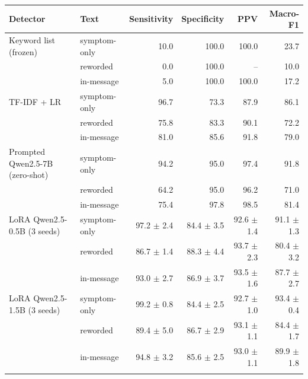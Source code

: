 \begin{tabular}{llrrrr}\toprule
Detector & Text & Sensitivity & Specificity & PPV & Macro-F1 \\ \midrule
Keyword list (frozen) & symptom-only & 10.0 & 100.0 & 100.0 & 23.7 \\
 & reworded & 0.0 & 100.0 & -- & 10.0 \\
 & in-message & 5.0 & 100.0 & 100.0 & 17.2 \\
\addlinespace
TF-IDF + LR & symptom-only & 96.7 & 73.3 & 87.9 & 86.1 \\
 & reworded & 75.8 & 83.3 & 90.1 & 72.2 \\
 & in-message & 81.0 & 85.6 & 91.8 & 79.0 \\
\addlinespace
Prompted Qwen2.5-7B (zero-shot) & symptom-only & 94.2 & 95.0 & 97.4 & 91.8 \\
 & reworded & 64.2 & 95.0 & 96.2 & 71.0 \\
 & in-message & 75.4 & 97.8 & 98.5 & 81.4 \\
\addlinespace
LoRA Qwen2.5-0.5B (3 seeds) & symptom-only & 97.2 $\pm$ 2.4 & 84.4 $\pm$ 3.5 & 92.6 $\pm$ 1.4 & 91.1 $\pm$ 1.3 \\
 & reworded & 86.7 $\pm$ 1.4 & 88.3 $\pm$ 4.4 & 93.7 $\pm$ 2.3 & 80.4 $\pm$ 3.2 \\
 & in-message & 93.0 $\pm$ 2.7 & 86.9 $\pm$ 3.7 & 93.5 $\pm$ 1.6 & 87.7 $\pm$ 2.7 \\
\addlinespace
LoRA Qwen2.5-1.5B (3 seeds) & symptom-only & 99.2 $\pm$ 0.8 & 84.4 $\pm$ 2.5 & 92.7 $\pm$ 1.0 & 93.4 $\pm$ 0.4 \\
 & reworded & 89.4 $\pm$ 5.0 & 86.7 $\pm$ 2.9 & 93.1 $\pm$ 1.1 & 84.4 $\pm$ 1.7 \\
 & in-message & 94.8 $\pm$ 3.2 & 85.6 $\pm$ 2.5 & 93.0 $\pm$ 1.1 & 89.9 $\pm$ 1.8 \\
\addlinespace
\bottomrule\end{tabular}

